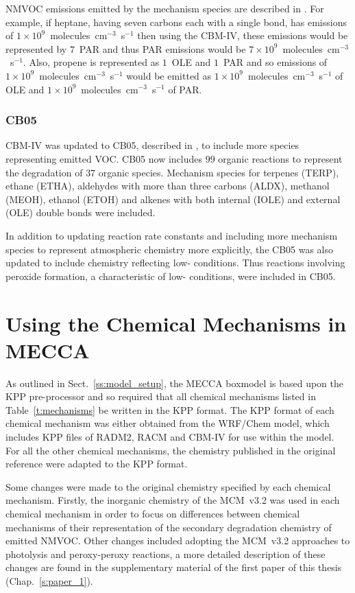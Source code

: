 NMVOC emissions emitted by the mechanism species are described in \citet{Hogo:1989}.
For example, if heptane, having seven carbons each with a single bond, has emissions of $1 \times 10^9$~molecules~cm$^{-3}$~s$^{-1}$ then using the CBM-IV, these emissions would be represented by $7$~PAR and thus PAR emissions would be $7 \times 10^9$~molecules~cm$^{-3}$~s$^{-1}$.
Also, propene is represented as $1$~OLE and $1$~PAR and so emissions of $1 \times 10^9$~molecules~cm$^{-3}$~s$^{-1}$  would be emitted as $1 \times 10^9$~molecules~cm$^{-3}$~s$^{-1}$ of OLE and $1 \times 10^9$~molecules~cm$^{-3}$~s$^{-1}$ of PAR.

\subsubsection{CB05}
CBM-IV was updated to CB05, described in \citet{Yarwood:2005}, to include more species representing emitted VOC.
CB05 now includes $99$ organic reactions to represent the degradation of $37$ organic species.
Mechanism species for terpenes (TERP), ethane (ETHA), aldehydes with more than three carbons (ALDX), methanol (MEOH), ethanol (ETOH) and alkenes with both internal (IOLE) and external (OLE) double bonds were included.  

In addition to updating reaction rate constants and including more mechanism species to represent atmospheric chemistry more explicitly, the CB05 was also updated to include chemistry reflecting low- conditions.
Thus reactions involving peroxide formation, a characteristic of low- conditions, were included in CB05.

\section{Using the Chemical Mechanisms in MECCA}
As outlined in Sect.~\ref{ss:model_setup}, the MECCA boxmodel is based upon the KPP pre-processor and so required that all chemical mechanisms listed in Table~\ref{t:mechanisms} be written in the KPP format.
The KPP format of each chemical mechanism was either obtained from the WRF/Chem \citep{Grell:2005}  model, which includes KPP files of RADM2, RACM and CBM-IV for use within the model.
For all the other chemical mechanisms, the chemistry published in the original reference were adapted to the KPP format.

Some changes were made to the original chemistry specified by each chemical mechanism.
Firstly, the inorganic chemistry of the MCM~v3.2 was used in each chemical mechanism in order to focus on differences between chemical mechanisms of their representation of the secondary degradation chemistry of emitted NMVOC.
Other changes included adopting the MCM~v3.2 approaches to photolysis and peroxy-peroxy reactions, a more detailed description of these changes are found in the supplementary material of the first paper of this thesis (Chap.~\ref{s:paper_1}). 
